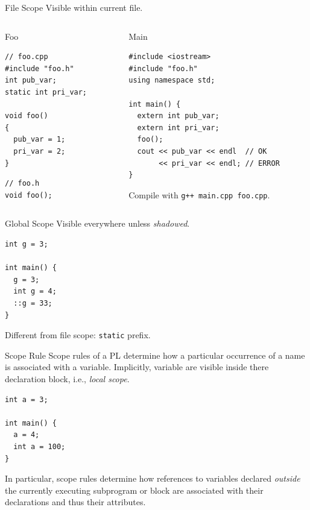 \documentclass[presentation]{beamer}
\begin{document}
\begin{frame}[fragile,label={sec:orgheadline27}]{File Scope}
 Visible within current file.

\begin{columns}
\begin{column}{0.5\columnwidth}
\begin{block}{Foo}
\begin{verbatim}
// foo.cpp
#include "foo.h"
int pub_var;
static int pri_var;

void foo()
{
  pub_var = 1;
  pri_var = 2;
}
\end{verbatim}

\begin{verbatim}
// foo.h
void foo();
\end{verbatim}
\end{block}
\end{column}

\begin{column}{0.5\columnwidth}
\begin{block}{Main}
\begin{verbatim}
#include <iostream>
#include "foo.h"
using namespace std;

int main() {
  extern int pub_var;
  extern int pri_var;
  foo();
  cout << pub_var << endl  // OK
       << pri_var << endl; // ERROR
}
\end{verbatim}

Compile with \texttt{g++ main.cpp foo.cpp}.
\end{block}
\end{column}
\end{columns}
\end{frame}

\begin{frame}[fragile,label={sec:orgheadline28}]{Global Scope}
 Visible everywhere unless \emph{shadowed}.

\begin{verbatim}
int g = 3;

int main() {
  g = 3;
  int g = 4;
  ::g = 33;
}
\end{verbatim}

Different from file scope: \texttt{static} prefix.
\end{frame}

\begin{frame}[fragile,label={sec:orgheadline29}]{Scope Rule}
 Scope rules of a PL determine how a particular occurrence of a name
is associated with a variable.  Implicitly, variable are visible
inside there declaration block, i.e., \emph{local scope}.

\begin{verbatim}
int a = 3;

int main() {
  a = 4;
  int a = 100;
}
\end{verbatim}

In particular, scope rules determine how references to variables
declared \emph{outside} the currently executing subprogram or block are
associated with their declarations and thus their attributes.
\end{frame}
\end{document}
